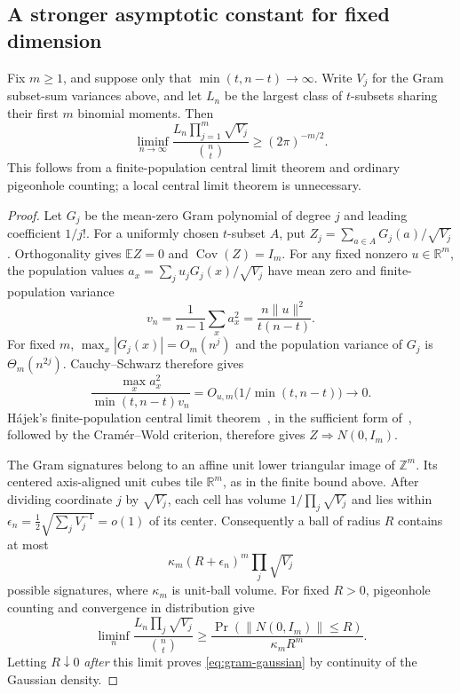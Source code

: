 \documentclass[11pt,letterpaper]{article}
\theoremstyle{definition}
\theoremstyle{remark}
\begin{document}
\subsection{A stronger asymptotic constant for fixed dimension}
\label{sec:gram-gaussian}
Fix $m\ge1$, and suppose only that $\min(t,n-t)\to\infty$.
Write $V_j$ for the
Gram subset-sum variances above, and let $L_n$ be the largest class of
$t$-subsets sharing their first $m$ binomial moments. Then
\begin{equation}\label{eq:gram-gaussian}
 \liminf_{n\to\infty}
 \frac{L_n\prod_{j=1}^m\sqrt{V_j}}{\binom nt}
 \ge (2\pi)^{-m/2}.
\end{equation}
This follows from a finite-population central limit theorem and ordinary
pigeonhole counting; a local central limit theorem is unnecessary.

\begin{proof}
Let $G_j$ be the mean-zero Gram polynomial of degree $j$ and leading
coefficient $1/j!$. For a uniformly chosen $t$-subset $A$, put
$Z_j=\sum_{a\in A}G_j(a)/\sqrt{V_j}$. Orthogonality gives
$\mathbb EZ=0$ and $\operatorname{Cov}(Z)=I_m$.
For any fixed nonzero $u\in\mathbb R^m$, the population values
$a_x=\sum_j u_jG_j(x)/\sqrt{V_j}$ have mean zero and finite-population
variance
\[
 v_n=\frac1{n-1}\sum_xa_x^2
     =\frac{n\|u\|^2}{t(n-t)}.
\]
For fixed $m$, $\max_x|G_j(x)|=O_m(n^j)$ and the population
variance of $G_j$ is $\Theta_m(n^{2j})$. Cauchy--Schwarz therefore gives
\[
 \frac{\max_xa_x^2}{\min(t,n-t)v_n}
 =O_{u,m}\bigl(1/\min(t,n-t)\bigr)\to0.
\]
H\'ajek's finite-population central limit theorem~\cite{hajek}, in the
sufficient form of~\cite[Theorem~1]{liding}, followed by the
Cram\'er--Wold criterion,
therefore gives $Z\Rightarrow N(0,I_m)$.

The Gram signatures belong to an affine unit lower triangular image
of $\mathbb Z^m$. Its centered axis-aligned unit cubes tile
$\mathbb R^m$, as in the finite bound above. After dividing coordinate
$j$ by $\sqrt{V_j}$, each cell has volume
$1/\prod_j\sqrt{V_j}$ and lies within
$\epsilon_n=\tfrac12\sqrt{\sum_jV_j^{-1}}=o(1)$ of its center.
Consequently a ball of radius $R$ contains at most
\[
 \kappa_m(R+\epsilon_n)^m\prod_j\sqrt{V_j}
\]
possible signatures, where $\kappa_m$ is unit-ball volume.
For fixed $R>0$, pigeonhole counting and convergence in distribution give
\[
 \liminf_n\frac{L_n\prod_j\sqrt{V_j}}{\binom nt}
 \ge\frac{\Pr(\|N(0,I_m)\|\le R)}{\kappa_m R^m}.
\]
Letting $R\downarrow0$ \emph{after} this limit proves
\eqref{eq:gram-gaussian} by continuity of the Gaussian density.
\end{proof}
\end{document}

